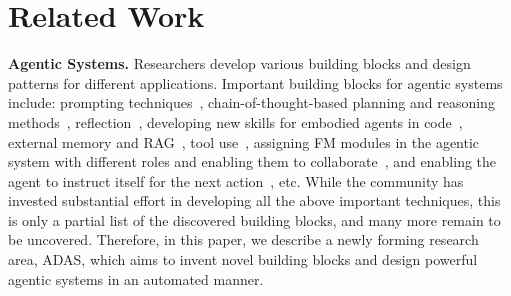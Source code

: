 \documentclass{article} %
\newcommand{\problem}{ADAS\xspace}
\begin{document}
\section{Related Work}

\label{section:related_work}

\noindent\textbf{Agentic Systems.}\hspace{0.5em} Researchers develop various building blocks and design patterns for different applications.
Important building blocks for agentic systems include: prompting techniques~\citep{chen2023unleashing,schulhoff2024prompt}, chain-of-thought-based planning and reasoning methods~\citep{wei2022chain,yao2023react,hu2023ThoughtCloning}, reflection~\citep{madaan2024self,shinn2024reflexion}, developing new skills for embodied agents in code~\citep{wang2023voyager,vemprala2023chatgpt_robotics}, external memory and RAG~\citep{zhang2024memroysurvey,lewis2020rag}, tool use~\citep{qu2024toolsurvey,schick2023toolformer,nakano2021webgpt}, assigning FM modules in the agentic system with different roles and enabling them to collaborate~\citep{hong2023metagpt,wu2023autogen,qian2023communicative,xu2023expertprompting,qian2024scaling}, and enabling the agent to instruct itself for the next action~\citep{autogpt}, etc. While the community has invested substantial effort in developing all the above important techniques, this is only a partial list of the discovered building blocks, and many more remain to be uncovered. Therefore, in this paper, we describe a newly forming research area, \problem, which aims to invent novel building blocks and design powerful agentic systems in an automated manner.
\end{document}
